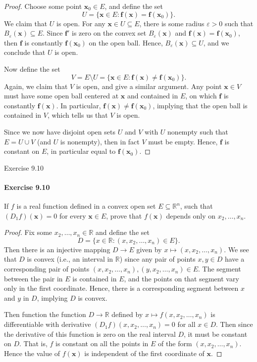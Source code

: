 \documentclass[12pt]{article}
\newenvironment{fullbox}{\begin{lrbox}{\savefullbox}\begin{minipage}{\dimexpr\textwidth-2\fboxsep\relax}}{\end{minipage}\end{lrbox}\begin{center}\framebox[\textwidth]{\usebox{\savefullbox}}\end{center}}
\newenvironment{pbox}[1][]{\begin{fullbox}\ifx#1\empty\else\paragraph{#1}\fi}{\end{fullbox}}
\theoremstyle{definition}
\newcommand{\R}{\mathbb{R}}
\newcommand{\eps}{\varepsilon}
\newcommand{\bm}{\mathbf}
\newcommand{\x}{\mathbf{x}}
\begin{document}
\begin{proof}
    Choose some point $\x_0 \in E$, and define the set
    \[
        U = \{\x \in E : \bm{f}(\x) = \bm{f}(\x_0)\}.
    \]
    We claim that $U$ is open. For any $\x \in U \subseteq E$, there is some radius $\eps > 0$ such that $B_{\eps}(\x) \subseteq E$. Since $\bm{f}'$ is zero on the convex set $B_{\eps}(\x)$ and $\bm{f}(\x) = \bm{f}(\x_0)$, then $\bm{f}$ is constantly $\bm{f}(\x_0)$ on the open ball. Hence, $B_{\eps}{(\x)} \subseteq U$, and we conclude that $U$ is open.

    Now define the set
    \[
        V = E \setminus U = \{\x \in E : \bm{f}(\x) \ne \bm{f}(\x_0)\}.
    \]
    Again, we claim that $V$ is open, and give a similar argument. Any point $\x \in V$ must have some open ball centered at $\x$ and contained in $E$, on which $\bm{f}$ is constantly $\bm{f}(\x)$. In particular, $\bm{f}(\x) \ne \bm{f}(\x_0)$, implying that the open ball is contained in $V$, which tells us that $V$ is open.

    Since we now have disjoint open sets $U$ and $V$ with $U$ nonempty such that $E = U \cup V$ (and $U$ is nonempty), then in fact $V$ must be empty. Hence, $\bm{f}$ is constant on $E$, in particular equal to $\bm{f}(\x_0)$.

\end{proof}



\newpage
\begin{pbox}[Exercise 9.10]
    If $f$ is a real function defined in a convex open set $E \subseteq \R^n$, such that $(D_1f)(\x) = 0$ for every $\x \in E$, prove that $f(\x)$ depends only on $x_2, \dots, x_n$.
\end{pbox}

\begin{proof}
    Fix some $x_2, \dots, x_n \in \R$ and define the set
    \[
        D = \{x \in \R : (x, x_2, \dots, x_n) \in E\}.
    \]
    Then there is an injective mapping $D \to E$ given by $x \mapsto (x, x_2, \dots, x_n)$. We see that $D$ is convex (i.e., an interval in $\R$) since any pair of points $x, y \in D$ have a corresponding pair of points $(x, x_2, \dots, x_n), (y, x_2, \dots, x_n) \in E$. The segment between the pair in $E$ is contained in $E$, and the points on that segment vary only in the first coordinate. Hence, there is a corresponding segment between $x$ and $y$ in $D$, implying $D$ is convex.

    Then function the function $D \to \R$ defined by $x \mapsto f(x, x_2, \dots, x_n)$ is differentiable with derivative $(D_1f)(x, x_2, \dots, x_n) = 0$ for all $x \in D$. Then since the derivative of this function is zero on the real interval $D$, it must be constant on $D$. That is, $f$ is constant on all the points in $E$ of the form $(x, x_2, \dots, x_n)$. Hence the value of $f(\x)$ is independent of the first coordinate of $\x$.


\end{proof}
\end{document}
